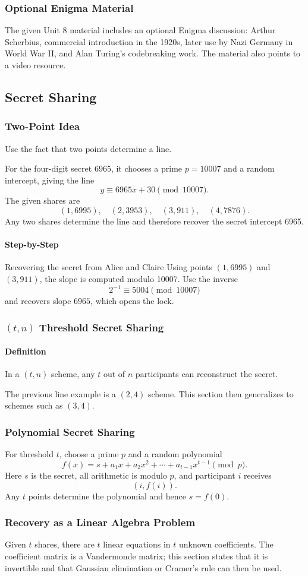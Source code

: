 \documentclass[12pt]{article}
\newcommand{\Definition}{\paragraph{Definition}}
\newcommand{\Step}{\paragraph{Step-by-Step}}
\begin{document}
\subsubsection{Optional Enigma Material}
The given Unit 8 material includes an optional Enigma discussion: Arthur Scherbius, commercial introduction in the 1920s, later use by Nazi Germany in World War II, and Alan Turing's codebreaking work. The material also points to a video resource.

\subsection{Secret Sharing}
\subsubsection{Two-Point Idea}
Use the fact that two points determine a line.

For the four-digit secret 6965, it chooses a prime $p=10007$ and a random intercept, giving the line
\[
y\equiv6965x+30\pmod{10007}.
\]
The given shares are
\[
(1,6995),\quad(2,3953),\quad(3,911),\quad(4,7876).
\]
Any two shares determine the line and therefore recover the secret intercept 6965.

\Step{Recovering the secret from Alice and Claire}
Using points $(1,6995)$ and $(3,911)$, the slope is computed modulo 10007. Use the inverse
\[
2^{-1}\equiv5004\pmod{10007}
\]
and recovers slope $6965$, which opens the lock.

\subsubsection{$(t,n)$ Threshold Secret Sharing}
\Definition In a $(t,n)$ scheme, any $t$ out of $n$ participants can reconstruct the secret.

The previous line example is a $(2,4)$ scheme. This section then generalizes to schemes such as $(3,4)$.

\subsubsection{Polynomial Secret Sharing}
For threshold $t$, choose a prime $p$ and a random polynomial
\[
f(x)=s+a_1x+a_2x^2+\cdots+a_{t-1}x^{t-1}
\pmod p.
\]
Here $s$ is the secret, all arithmetic is modulo $p$, and participant $i$ receives
\[
(i,f(i)).
\]
Any $t$ points determine the polynomial and hence $s=f(0)$.

\subsubsection{Recovery as a Linear Algebra Problem}
Given $t$ shares, there are $t$ linear equations in $t$ unknown coefficients. The coefficient matrix is a Vandermonde matrix; this section states that it is invertible and that Gaussian elimination or Cramer's rule can then be used.
\end{document}
